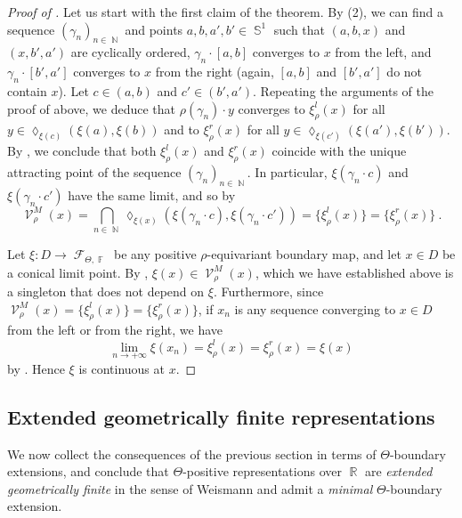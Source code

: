 \documentclass{amsart}
\theoremstyle{plain}
\theoremstyle{definition}
\DeclareMathOperator{\Diam}{\lozenge}
\DeclareMathOperator{\Fc}{\mathcal{F}}
\DeclareMathOperator{\Vc}{\mathcal{V}}
\DeclareMathOperator{\Fb}{{\mathbb{F}}}
\DeclareMathOperator{\Nb}{{\mathbb{N}}}
\DeclareMathOperator{\Rb}{{\mathbb{R}}}
\DeclareMathOperator{\Sb}{\mathbb{S}}
\newcommand{\1}{\mathbf{1}}
\begin{document}
\begin{proof}[Proof of ]
Let us start with the first claim of the theorem. By (2), we can find a sequence $(\gamma_n)_{n\in\Nb}$ and points $a,b,a',b'\in\Sb^1$ such that $(a,b,x)$ and $(x,b',a')$ are cyclically ordered, $\gamma_n\cdot [a,b]$ converges to $x$ from the left, and $\gamma_n\cdot[b',a']$ converges to $x$ from the right (again, $[a,b]$ and $[b',a']$ do not contain $x$). Let $c\in (a,b)$ and $c'\in(b',a')$. Repeating the arguments of the proof of  above, we deduce that $\rho(\gamma_n)\cdot y$ converges to $\xi^l_\rho(x)$ for all $y\in \Diam_{\xi(c)}(\xi(a),\xi(b))$ and to $\xi^r_\rho(x)$ for all $y\in \Diam_{\xi(c')}(\xi(a'),\xi(b'))$.
    By , we conclude that both $\xi^l_\rho(x)$ and $\xi^r_\rho(x)$ coincide with the unique attracting point of the sequence $(\gamma_n)_{n\in\Nb}$.
    In particular, $\xi(\gamma_n\cdot c)$ and $\xi(\gamma_n\cdot c')$ have the same limit, and so by 
    \[\Vc^M_\rho(x)=\bigcap_{n\in \Nb} \Diam_{\xi(x)}(\xi(\gamma_n\cdot c),\xi(\gamma_n\cdot c')) = \{\xi^l_\rho(x)\} = \{\xi^r_\rho(x)\}~.\]

Let $\xi:D\to \Fc_{\Theta,\Fb}$ be any positive $\rho$-equivariant boundary map, and let $x\in D$ be a conical limit point. By , $\xi(x)\in \Vc^M_\rho(x)$, which we have established above is a singleton that does not depend on $\xi$. Furthermore, since $\Vc^M_\rho(x)=\{\xi^l_\rho(x)\} = \{\xi^r_\rho(x)\}$, if $x_n$ is any sequence converging to $x\in D$ from the left or from the right, we have
    \[\lim_{n\to +\infty} \xi(x_n) = \xi^l_\rho(x) = \xi^r_\rho(x)= \xi(x)\]
    by . Hence $\xi$ is continuous at $x$.
\end{proof}


\subsection{Extended geometrically finite representations}\label{subsection: EGF}

We now collect the consequences of the previous section in terms of $\Theta$-boundary extensions, and conclude that $\Theta$-positive representations over $\Rb$ are \emph{extended geometrically finite} in the sense of Weismann and admit a \emph{minimal} $\Theta$-boundary extension. \\
\end{document}
